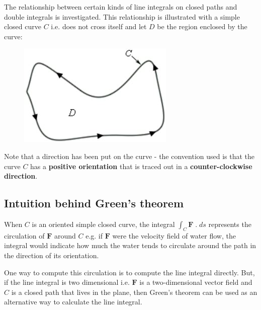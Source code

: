 \documentclass[10pt,a4paper]{article}
\begin{document}
The relationship between certain kinds of line integrals on closed paths and double integrals is
investigated. This relationship is illustrated with a simple closed curve $C$ i.e. does not cross
itself and let $D$ be the region enclosed by the curve:
\begin{figure} [h!]
    \centering
    \includegraphics[scale=0.6]{Intro green.JPG}
\end{figure}

Note that a direction has been put on the curve - the convention used is that the curve $C$ has a
\textbf{positive orientation} that is traced out in a \textbf{counter-clockwise direction}. 

\subsection{Intuition behind Green's theorem}

When $C$ is an oriented simple closed curve, the integral $\int_C \textbf{F}\;.\;ds$ represents the
circulation of $\textbf{F}$ around $C$ e.g. if $\textbf{F}$ were the velocity field of water flow,
the integral would indicate how much the water tends to circulate around the path in the direction
of its orientation. \par

One way to compute this circulation is to compute the line integral directly. But, if the line
integral is two dimensional i.e. $\textbf{F}$ is a two-dimensional vector field and $C$ is a closed path that
lives in the plane, then Green's theorem can be used as an alternative way to calculate the line integral.
\end{document}
